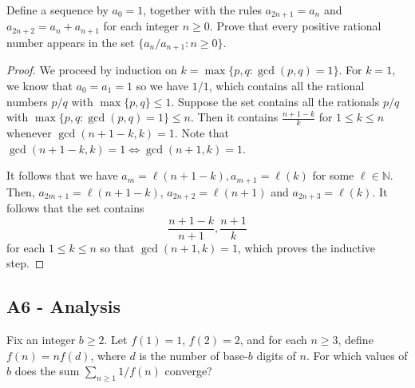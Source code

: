 \documentclass[11pt]{scrartcl}
\newcommand{\N}{\mathbb{N}}
\newcommand{\<}{\langle}
\renewcommand{\>}{\rangle}
\begin{document}
Define a sequence by $a_0 = 1$, together with the rules $a_{2n+1} = a_n$ and $a_{2n+2} = a_n + a_{n+1}$ for each integer $n \ge 0$.  Prove that every positive rational number appears in the set $\{a_n/a_{n+1}: n \ge 0\}$.

\begin{proof}
We proceed by induction on $k = \max\{p, q: \gcd(p, q) = 1\}$.  For $k = 1$, we know that $a_0 = a_1 = 1$ so we have $1/1$, which contains all the rational numbers $p/q$ with $\max\{p, q\} \le 1$.  Suppose the set contains all the rationals $p/q$ with $\max\{p, q: \gcd(p, q) = 1\} \le n$.  Then it contains $\frac{n+1-k}{k}$ for $1 \le k \le n$ whenever $\gcd(n+1-k, k) = 1$.  Note that $\gcd(n+1 - k, k) = 1 \Leftrightarrow \gcd(n+1, k) = 1$.

It follows that we have $a_m = \ell(n + 1 - k), a_{m+1} = \ell(k)$ for some $\ell \in \N$.  Then, $a_{2m+1} = \ell(n+1-k)$, $a_{2n+2} = \ell(n+1)$ and $a_{2n+3} = \ell(k)$.  It follows that the set contains 
$$\frac{n+1-k}{n+1}, \frac{n+1}{k}$$
for each $1 \le k\le n$ so that $\gcd(n+1, k) = 1$, which proves the inductive step.  
\end{proof}

\pagebreak
\subsection{A6 - Analysis}
Fix an integer $b \ge 2$.  Let $f(1) = 1$, $f(2) = 2$, and for each $n \ge 3$, define $f(n) = nf(d)$, where $d$ is the number of base-$b$ digits of $n$.  For which values of $b$ does the sum $\sum_{n \ge 1} 1/f(n)$ converge?
\end{document}
